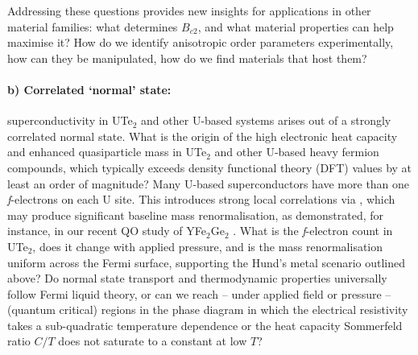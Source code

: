 Addressing these questions provides new insights for applications in other material families: what determines $B_{c2}$, and what material properties can help maximise it? How do we identify anisotropic order parameters experimentally, how can they be manipulated, how do we find materials that host them?

\paragraph{b) Correlated `normal' state:} %
superconductivity in UTe$_2$ and other U-based systems arises out of a strongly correlated normal state. What is the origin of the high electronic heat capacity and enhanced quasiparticle mass in UTe$_2$ and other U-based heavy fermion compounds, which typically exceeds density functional theory (DFT) values by at least an order of magnitude? 
Many U-based superconductors have more than one {\emph f}-electrons on each U site. This introduces strong local correlations via , which may produce significant baseline mass renormalisation, as demonstrated, for instance, in our recent QO study of YFe$_2$Ge$_2$ \cite{baglo22a}. What is the {\emph f}-electron count in UTe$_2$, does it change with applied pressure, and is the mass renormalisation uniform across the Fermi surface, supporting the Hund's metal scenario outlined above? Do normal state transport and thermodynamic properties universally follow Fermi liquid theory, or can we reach -- under applied field or pressure -- (quantum critical) regions in the phase diagram in which the electrical resistivity takes a sub-quadratic temperature dependence or the heat capacity Sommerfeld ratio $C/T$ does not saturate to a constant at low $T$? 



